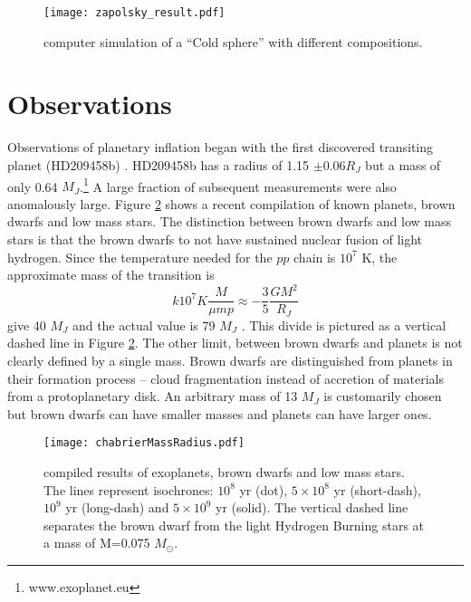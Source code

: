 \documentclass[twocolumn]{emulateapj}
\begin{document}
\begin{figure}[!htbp]
\begin{center}
\vspace{0.2in}
\texttt{[image: zapolsky\_result.pdf]}
\caption{\citet{zapolsky} computer simulation of a ``Cold sphere'' with different compositions.}
\label{zapolfig}
\end{center}
\end{figure}

\section{Observations}
Observations of planetary inflation began with the first discovered
transiting planet (HD209458b) \citep{charb,henry2000}. HD209458b has a
radius of 1.15 $\pm 0.06 R_J$ but a mass of only 0.64
$M_J$.\footnote{www.exoplanet.eu} A large fraction of subsequent
measurements were also anomalously large. Figure \ref{chabrierfig}
shows a recent compilation of known planets, brown dwarfs and low mass
stars. The distinction between brown dwarfs and low mass stars is that
the brown dwarfs to not have sustained nuclear fusion of light
hydrogen. Since the temperature needed for the $pp$ chain is $10^7$ K,
the approximate mass of the transition is
\begin{equation}
k 10^7 K \frac{M}{\mu mp} \approx -\frac{3}{5} \frac{G M^2}{R_J}
\end{equation}
give 40 $M_J$ and the actual value is 79 $M_J$
\citep{chabrier2010}. This divide is pictured as a vertical dashed
line in Figure \ref{chabrierfig}. The other limit, between brown
dwarfs and planets is not clearly defined by a single mass. Brown
dwarfs are distinguished from planets in their formation process --
cloud fragmentation instead of accretion of materials from a
protoplanetary disk. An arbitrary mass of 13 $M_J$ is customarily
chosen but brown dwarfs can have smaller masses and planets can have
larger ones.

\begin{figure}[!htbp]
\begin{center}
\texttt{[image: chabrierMassRadius.pdf]}
\caption{\citet{chabrier2010} compiled results of exoplanets, brown dwarfs and low mass stars. The lines represent isochrones: $10^8$ yr (dot), $5 \times 10^8$ yr (short-dash), $10^9$ yr (long-dash) and $5 \times 10^9$ yr (solid). The vertical dashed line separates the brown dwarf from the light Hydrogen Burning stars at a mass of M=0.075 $M_\odot$.}
\label{chabrierfig}
\end{center}
\end{figure}
\end{document}
